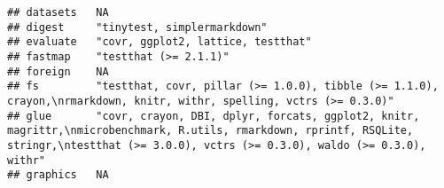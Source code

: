 \documentclass[
]{article}
\begin{document}
\begin{verbatim}
## datasets   NA                                                                                                                                                                                                                                                                                                                                                 
## digest     "tinytest, simplermarkdown"                                                                                                                                                                                                                                                                                                                        
## evaluate   "covr, ggplot2, lattice, testthat"                                                                                                                                                                                                                                                                                                                 
## fastmap    "testthat (>= 2.1.1)"                                                                                                                                                                                                                                                                                                                              
## foreign    NA                                                                                                                                                                                                                                                                                                                                                 
## fs         "testthat, covr, pillar (>= 1.0.0), tibble (>= 1.1.0), crayon,\nrmarkdown, knitr, withr, spelling, vctrs (>= 0.3.0)"                                                                                                                                                                                                                               
## glue       "covr, crayon, DBI, dplyr, forcats, ggplot2, knitr, magrittr,\nmicrobenchmark, R.utils, rmarkdown, rprintf, RSQLite, stringr,\ntestthat (>= 3.0.0), vctrs (>= 0.3.0), waldo (>= 0.3.0), withr"                                                                                                                                                     
## graphics   NA                                                                                                                                                                                                                                                                                                                                                 

\end{verbatim}
\end{document}
